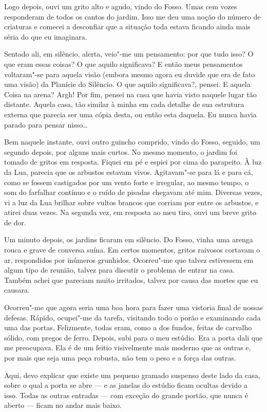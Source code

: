 Logo depois, ouvi um grito alto e agudo, vindo do Fosso. Umas cem vozes responderam de todos os cantos do
jardim. Isso me deu uma noção do número de criaturas e comecei a desconfiar que a situação toda estava ficando ainda
mais séria do que eu imaginara.

Sentado ali, em silêncio, alerta, veio"-me um pensamento: por que tudo isso? O que eram essas coisas? O que aquilo
significava? E então meus pensamentos voltaram"-se para aquela visão (embora mesmo agora eu duvide que era de fato uma
visão) da Planície do Silêncio. O que aquilo significava?, pensei. E aquela Coisa na arena? Argh! Por fim, pensei na
casa que havia visto naquele lugar tão distante. Aquela casa, tão similar à minha em cada detalhe de sua estrutura
externa que parecia ser uma cópia desta, ou então esta daquela. Eu nunca havia parado para pensar nisso\ldots{}

Bem naquele instante, ouvi outro guincho comprido, vindo do Fosso, seguido, um segundo depois, por alguns mais curtos.
No mesmo momento, o jardim foi tomado de gritos em resposta. Fiquei em pé e espiei por cima do parapeito. À
luz da Lua, parecia que os arbustos estavam vivos. Agitavam"-se para lá e para cá, como se fossem castigados por um
vento forte e irregular, ao mesmo tempo, o som do farfalhar contínuo e o ruído de pisadas chegavam até mim. Diversas
vezes, vi a luz da Lua brilhar sobre vultos brancos que corriam por entre os arbustos, e atirei duas vezes. Na segunda
vez, em resposta ao meu tiro, ouvi um breve grito de dor.

Um minuto depois, os jardins ficaram em silêncio. Do Fosso, vinha uma arenga rouca e grave de conversa suína. Em certos
momentos, gritos raivosos cortavam o ar, respondidos por inúmeros grunhidos. Ocorreu"-me que talvez estivessem em algum
tipo de reunião, talvez para discutir o problema de entrar na casa. Também achei que pareciam muito irritados, talvez
por causa das mortes que eu causara.

Ocorreu"-me que agora seria uma boa hora para fazer uma vistoria final de nossas defesas. Rápido, ocupei"-me da
tarefa, visitando todo o porão e examinando cada uma das portas. Felizmente, todas eram, como a dos fundos, feitas de
carvalho sólido, com pregos de ferro. Depois, subi para o meu estúdio. Era a porta dali que me preocupava. Ela é
de um feitio visivelmente mais moderno que as outras e, por mais que seja uma peça robusta, não tem o peso e a força
das outras.

Aqui, devo explicar que existe um pequeno gramado suspenso deste lado da casa, sobre o qual a porta se abre --- e as
janelas do estúdio ficam ocultas devido a isso. Todas as outras entradas --- com exceção do grande portão, que nunca é
aberto --- ficam no andar mais baixo.


